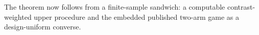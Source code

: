 The theorem now follows from a finite-sample sandwich: a computable contrast-weighted upper procedure and the embedded published two-arm game as a design-uniform converse.